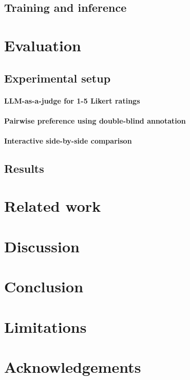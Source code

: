 \documentclass[11pt]{article}
\begin{document}
\subsection{Training and inference}


\section{Evaluation}
\subsection{Experimental setup}

\paragraph{LLM-as-a-judge for 1-5 Likert ratings}

\paragraph{Pairwise preference using double-blind annotation}

\paragraph{Interactive side-by-side comparison}

\subsection{Results}

\section{Related work}
\section{Discussion}
\section{Conclusion}
\section{Limitations}

\section*{Acknowledgements}

%
\end{document}
